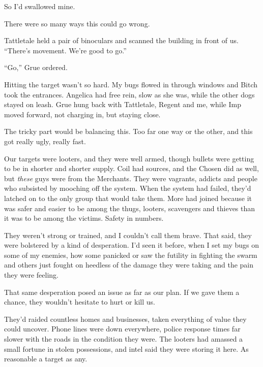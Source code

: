 So I'd swallowed mine.



\sectionbreak






There were so many ways this could go wrong.



Tattletale held a pair of binoculars and scanned the building in front of us.  ``There's movement.  We're good to go.''



``Go,'' Grue ordered.



Hitting the target wasn't so hard.  My bugs flowed in through windows and Bitch took the entrances.  Angelica had free rein, slow as she was, while the other dogs stayed on leash.  Grue hung back with Tattletale, Regent and me, while Imp moved forward, not charging in, but staying close.



The tricky part would be balancing this.  Too far one way or the other, and this got really ugly, really fast.



Our targets were looters, and they were well armed, though bullets were getting to be in shorter and shorter supply.  Coil had sources, and the Chosen did as well, but \emph{these} guys were from the Merchants.  They were vagrants, addicts and people who subsisted by mooching off the system.  When the system had failed, they'd latched on to the only group that would take them.  More had joined because it was safer and easier to be among the thugs, looters, scavengers and thieves than it was to be among the victims.  Safety in numbers.



They weren't strong or trained, and I couldn't call them brave.  That said, they were bolstered by a kind of desperation.  I'd seen it before, when I set my bugs on some of my enemies, how some panicked or saw the futility in fighting the swarm and others just fought on heedless of the damage they were taking and the pain they were feeling.



That same desperation posed an issue as far as our plan.  If we gave them a chance, they wouldn't hesitate to hurt or kill us.



They'd raided countless homes and businesses, taken everything of value they could uncover.  Phone lines were down everywhere, police response times far slower with the roads in the condition they were.  The looters had amassed a small fortune in stolen possessions, and intel said they were storing it here.  As reasonable a target as any.




